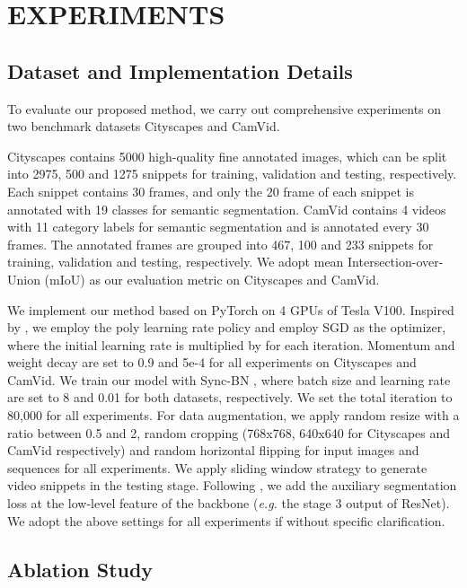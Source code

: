 \documentclass{article}
\begin{document}
	\section{EXPERIMENTS}
	\label{sec:experiments}
	\subsection{Dataset and Implementation Details}
	\label{ssec:dataset and implementation}
	To evaluate our proposed method, we carry out comprehensive experiments on two benchmark datasets Cityscapes\cite{Cityscapes} and CamVid\cite{Camvid}.
	
	Cityscapes \cite{Cityscapes} contains 5000 high-quality fine annotated images, which can be split into 2975, 500 and 1275 snippets for training, validation and testing, respectively. Each snippet contains 30 frames, and only the 20 frame of each snippet is annotated with 19 classes for semantic segmentation. CamVid \cite{Camvid} contains 4 videos with 11 category labels for semantic segmentation and is annotated every 30 frames. The annotated frames are grouped into 467, 100 and 233 snippets for training, validation and testing, respectively. We adopt mean Intersection-over-Union (mIoU) as our evaluation metric on Cityscapes and CamVid.
	
	We implement our method based on PyTorch on 4 GPUs of Tesla V100. Inspired by \cite{deeplab2017}, we employ the poly learning rate policy and employ SGD as the optimizer, where the initial learning rate is multiplied by  for each iteration. 
	Momentum and weight decay are set to 0.9 and 5e-4  for all experiments on Cityscapes and CamVid. 
	We train our model with Sync-BN \cite{encoding2018}, where batch size and learning rate are set to 8 and 0.01 for both datasets, respectively. 
	We set the total iteration to 80,000 for all experiments. For data augmentation, we apply random resize with a ratio between 0.5 and 2, random cropping (768x768, 640x640 for Cityscapes and CamVid respectively) and random horizontal flipping for input images and sequences for all experiments. We apply sliding window strategy to generate video snippets in the testing stage. Following \cite{PSPNet2017}, we add the auxiliary segmentation loss at the low-level feature of the backbone (\emph{e.g.} the stage 3 output of ResNet). We adopt the above settings for all experiments if without specific clarification.
	
	\subsection{Ablation Study}
	\label{ssec:ablations}
	
\end{document}
